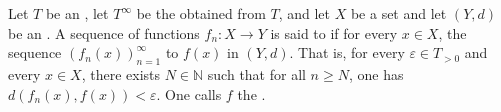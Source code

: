 \begin{definition} \label{definition:pointwise_convergence_of_a_sequence_of_functions_from_a_set_to_an_extended_metric_space}
    Let $T$ be an , let $T^\infty$ be the  obtained from $T$, and let $X$ be a set and let $(Y, d)$ be an .
    A sequence of functions $f_n : X \to Y$ is said to  if for every $x \in X$, the sequence $(f_n(x))_{n=1}^\infty$  to $f(x)$ in $(Y, d)$. That is, for every $\varepsilon \in T_{>0}$ and every $x \in X$, there exists $N \in \mathbb{N}$ such that for all $n \geq N$, one has $d(f_n(x), f(x)) < \varepsilon$. One calls $f$ the .
\end{definition}